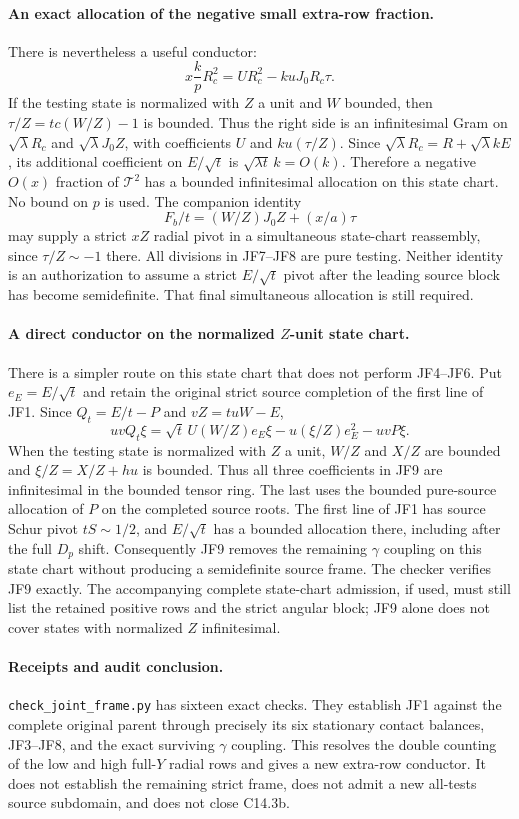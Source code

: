 \paragraph{An exact allocation of the negative small extra-row fraction.}
There is nevertheless a useful conductor:
\[
 x\frac{k}{p}R_c^2
          =U R_c^2-kuJ_0R_c\tau.                   \tag{JF7}
\]
If the testing state is normalized with $Z$ a unit and $W$ bounded,
then $\tau/Z=tc(W/Z)-1$ is bounded. Thus the right side is an
infinitesimal Gram on $\sqrt\lambda R_c$ and
$\sqrt\lambda J_0Z$, with coefficients $U$ and
$ku(\tau/Z)$. Since
$\sqrt\lambda R_c=R+\sqrt\lambda kE$, its additional coefficient
on $E/\sqrt t$ is $\sqrt{\lambda t}\,k=O(k)$.
Therefore a negative $O(x)$ fraction of $\mathcal T^2$ has a bounded
infinitesimal allocation on this state chart. No bound on $p$ is used.
The companion identity
\[
 F_b/t=(W/Z)J_0Z+(x/a)\tau                          \tag{JF8}
\]
may supply a strict $xZ$ radial pivot in a simultaneous state-chart
reassembly, since $\tau/Z\sim-1$ there. All divisions in JF7--JF8
are pure testing. Neither identity is an authorization to assume a
strict $E/\sqrt t$ pivot after the leading source block has become
semidefinite. That final simultaneous allocation is still required.

\paragraph{A direct conductor on the normalized $Z$-unit state chart.}
There is a simpler route on this state chart that does not perform JF4--JF6.
Put $e_E=E/\sqrt t$ and retain the original strict source completion
of the first line of JF1. Since $Q_t=E/t-P$ and $vZ=tuW-E$,
\[
 uvQ_t\xi=\sqrt t\,U(W/Z)e_E\xi
             -u(\xi/Z)e_E^2-uvP\xi.                \tag{JF9}
\]
When the testing state is normalized with $Z$ a unit, $W/Z$ and
$X/Z$ are bounded and $\xi/Z=X/Z+hu$ is bounded. Thus all three
coefficients in JF9 are infinitesimal in the bounded tensor ring.
The last uses the bounded pure-source allocation of $P$ on the
completed source roots. The first line of JF1 has source Schur pivot
$tS\sim1/2$, and $E/\sqrt t$ has a bounded allocation there,
including after the full $D_p$ shift. Consequently JF9 removes the
remaining $\gamma$ coupling on this state chart without producing
a semidefinite source frame. The checker verifies JF9 exactly.
The accompanying complete state-chart admission, if used, must still
list the retained positive rows and the strict angular block; JF9
alone does not cover states with normalized $Z$ infinitesimal.

\paragraph{Receipts and audit conclusion.}
\texttt{check\_joint\_frame.py} has sixteen exact checks. They establish
JF1 against the complete original parent through precisely its six
stationary contact balances, JF3--JF8, and the exact surviving
$\gamma$ coupling. This resolves the double counting of the low and
high full-$Y$ radial rows and gives a new extra-row conductor.
It does not establish the remaining strict frame, does not admit a
new all-tests source subdomain, and does not close C14.3b.
